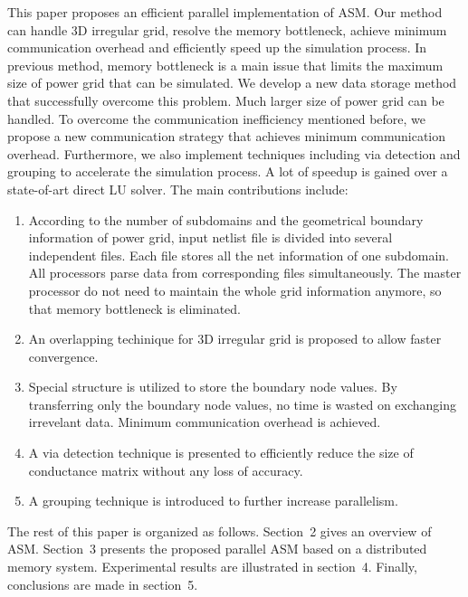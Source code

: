 \documentclass{sig-alternate}
\begin{document}
	This paper proposes an efficient parallel implementation of ASM. Our method can handle 3D irregular grid, resolve the memory 
	bottleneck, achieve minimum communication overhead and efficiently speed up the simulation process. In previous method, memory 
	bottleneck is a main issue that limits
	the maximum size of power grid that can be simulated. We develop a new data storage method that successfully overcome this 
	problem. Much larger size of power grid can be handled. To overcome the communication inefficiency mentioned before, 
	we propose a new communication strategy that achieves minimum communication overhead. Furthermore, we also implement techniques 
	including via detection and grouping to accelerate the simulation process. A lot of 
	speedup is gained over a state-of-art direct LU solver. The main contributions include:
	\begin{enumerate}[1)]
	\item According to the number of subdomains and the geometrical boundary information of power grid, input netlist file is divided 
	into several independent files. Each file stores all the net information of one subdomain. All processors parse data from 
	corresponding files simultaneously. The master processor do not need to maintain the whole grid information anymore, so that 
	memory bottleneck is eliminated.
	\item An overlapping techinique for 3D irregular grid is proposed to allow faster convergence. 
	\item Special structure is utilized to store the boundary node values. By transferring only the boundary node values, 
	no time is wasted on exchanging irrevelant data. Minimum communication overhead is achieved.
	\item A via detection technique is presented to efficiently reduce the size of conductance matrix without any loss of 
	accuracy.
	\item A grouping technique is introduced to further increase parallelism.
	\end{enumerate}

	The rest of this paper is organized as follows. Section~2 gives an overview of ASM. Section~3 presents 
	the proposed parallel ASM based on a distributed memory system. Experimental results are illustrated in section~4. 
	Finally, conclusions are made in section~5.
\end{document}
